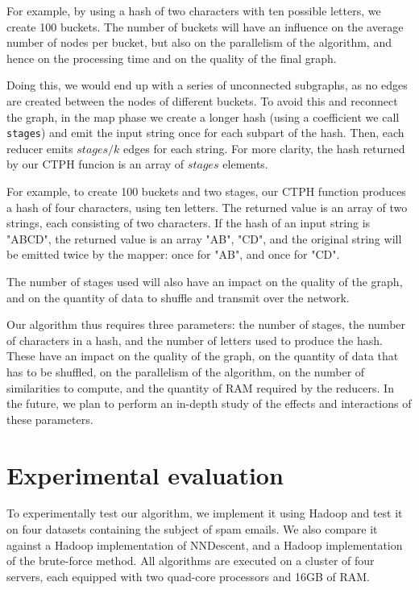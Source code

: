\documentclass[wcp]{jmlr}
\begin{document}
For example, by using a hash of two characters with ten possible letters, we create 100 buckets. The number of buckets will have an influence on the average number of nodes per bucket, but also on the parallelism of the algorithm, and hence on the processing time and on the quality of the final graph.

Doing this, we would end up with a series of unconnected subgraphs, as no edges are created between the nodes of different buckets. To avoid this and reconnect the graph, in the map phase we create a longer hash (using a coefficient we call \texttt{stages}) and emit the input string once for each subpart of the hash. Then, each reducer emits $stages/k$ edges for each string. For more clarity, the hash returned by our CTPH funcion is an array of $stages$ elements.

For example, to create 100 buckets and two stages, our CTPH function produces a hash of four characters, using ten letters. The returned value is an array of two strings, each consisting of two characters. If the hash of an input string is "ABCD", the returned value is an array "AB", "CD", and the original string will be emitted twice by the mapper: once for "AB", and once for "CD".

The number of stages used will also have an impact on the quality of the graph, and on the quantity of data to shuffle and transmit over the network.

Our algorithm thus requires three parameters: the number of stages, the number of characters in a hash, and the number of letters used to produce the hash. These have an impact on the quality of the graph, on the quantity of data that has to be shuffled, on the parallelism of the algorithm, on the number of similarities to compute, and the quantity of RAM required by the reducers. In the future, we plan to perform an in-depth study of the effects and interactions of these parameters.

\section{Experimental evaluation}

To experimentally test our algorithm, we implement it using Hadoop and test it on four datasets containing the subject of spam emails. We also compare it against a Hadoop implementation of NNDescent, and a Hadoop implementation of the brute-force method. All algorithms are executed on a cluster of four servers, each equipped with two quad-core processors and 16GB of RAM.
\end{document}
